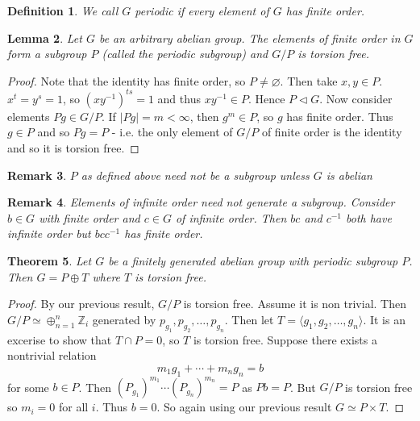 \documentclass[a4paper,10pt]{article}
\newcommand{\ZZ}{\mathbb{Z}}
\newtheorem{thm}{Theorem}
\newtheorem{Def}[thm]{Definition}
\newtheorem{Lem}[thm]{Lemma}
\newtheorem{rem}[thm]{Remark}
\begin{document}
\begin{Def}
We call $G$ periodic if every element of $G$ has finite order. 
\end{Def}

\begin{Lem}
Let $G$ be an arbitrary abelian group. The elements of finite order in $G$ form a subgroup $P$ (called the periodic subgroup) and $G / P$ is torsion free. 
\end{Lem}

\begin{proof}
Note that the identity has finite order, so $P \neq \varnothing$. Then take $x,y \in P$. $x^t = y^s = 1$, so $(xy^{-1})^{ts} = 1$ and thus $xy^{-1} \in P$. Hence $P \triangleleft G$. Now consider elements $Pg \in G / P$. If $|Pg| = m < \infty$, then $g^m \in P$, so $g$ has finite order. Thus $g \in P$ and so $Pg = P$ - i.e. the only element of $G / P$ of finite order is the identity and so it is torsion free. 
\end{proof}


\begin{rem}
$P$ as defined above need not be a subgroup unless $G$ is abelian
\end{rem}

\begin{rem}
Elements of infinite order need not generate a subgroup. Consider $b \in G$ with finite order and $c \in G$ of infinite order. Then $bc$ and $c^{-1}$ both have infinite order but $b c c^{-1}$ has finite order. 
\end{rem}

\begin{thm}
Let $G$ be a finitely generated abelian group with periodic subgroup $P$. Then $G = P \oplus T$ where $T$ is torsion free. 
\end{thm}

\begin{proof}
By our previous result, $G / P$ is torsion free. Assume it is non trivial. Then $G / P \simeq \oplus_{n = 1}^n \ZZ_i$ generated by $p_{g_1}, p_{g_2}, \dots, p_{g_n}$. Then let $T =  \langle g_1, g_2, \dots, g_n \rangle$. It is an excerise to show that $T \cap P = 0$, so $T$ is torsion free. Suppose there exists a nontrivial relation
\[ m_1g_1 + \cdots + m_n g_n = b \]
for some $b \in P$. Then $(P_{g_1})^{m_1} \cdots (P_{g_n})^{m_n} = P$ as $Pb = P$. But $G / P$ is torsion free so $m_i = 0$ for all $i$. Thus $b = 0$. So again using our previous result $G \simeq P \times T$. 
\end{proof}
\end{document}
